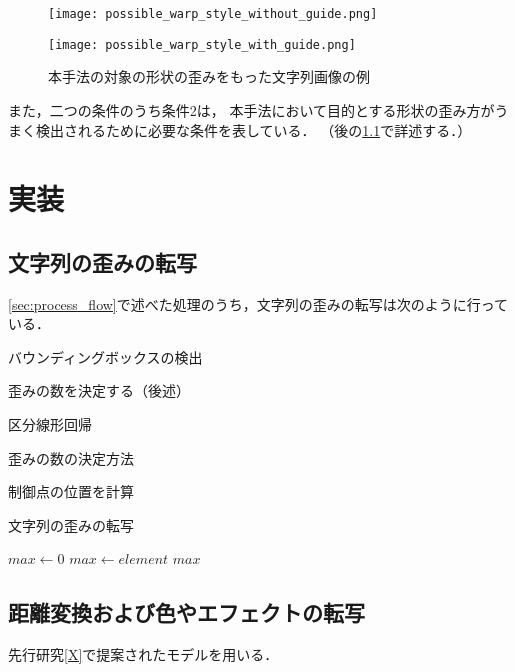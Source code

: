 \documentclass[\homedir/main.tex]{subfiles}
\begin{document}
\begin{figure}[h]
    \centering
    \begin{minipage}[b]{0.45\linewidth}
        \centering
        \texttt{[image: possible\_warp\_style\_without\_guide.png]}
        \label{fig:poss_warp_wo_guide}
    \end{minipage}
    \begin{minipage}[b]{0.45\linewidth}
        \centering
        \texttt{[image: possible\_warp\_style\_with\_guide.png]}
        \label{fig:poss_warp_with_guide}
    \end{minipage}
    \caption{本手法の対象の形状の歪みをもった文字列画像の例}
    \label{fig:possible_warp_style}
\end{figure}

また，二つの条件のうち条件2は，
本手法において目的とする形状の歪み方がうまく検出されるために必要な条件を表している．
（後の\cref{sec:warp_style_transfer}で詳述する．）

\section{実装}\label{sec:implementation}
\subsection{文字列の歪みの転写}\label{sec:warp_style_transfer}
\cref{sec:process_flow}で述べた処理のうち，文字列の歪みの転写は次のように行っている．

バウンディングボックスの検出

歪みの数を決定する（後述）

区分線形回帰

歪みの数の決定方法

制御点の位置を計算

\begin{algorithm}[h]
    \caption{文字列の歪みの転写}
    \label{alg-X}
    \begin{algorithmic}[1]

        \State $max \gets 0$
        \State $max \gets element$
        \EndIf
        \EndFor
        \State \Return $max$
        \EndFunction

    \end{algorithmic}
\end{algorithm}

\subsection{距離変換および色やエフェクトの転写}
先行研究\cref{X}で提案されたモデルを用いる．



\printBibForSubfiles
\end{document}
